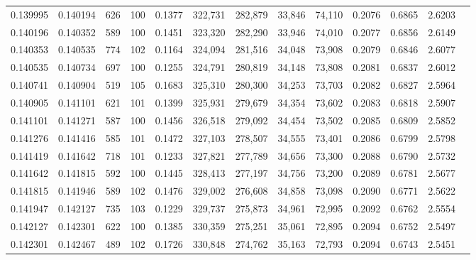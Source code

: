 \begin{tabular}{rrrrrrrrrrrrr}
0.139995 & 0.140194 &   626 & 100 &                                     0.1377 & 322,731 & 282,879 &  33,846 &  74,110 & 0.2076 & 0.6865 & 2.6203 \\
0.140196 & 0.140352 &   589 & 100 &                                     0.1451 & 323,320 & 282,290 &  33,946 &  74,010 & 0.2077 & 0.6856 & 2.6149 \\
0.140353 & 0.140535 &   774 & 102 &                                     0.1164 & 324,094 & 281,516 &  34,048 &  73,908 & 0.2079 & 0.6846 & 2.6077 \\
0.140535 & 0.140734 &   697 & 100 &                                     0.1255 & 324,791 & 280,819 &  34,148 &  73,808 & 0.2081 & 0.6837 & 2.6012 \\
0.140741 & 0.140904 &   519 & 105 &                                     0.1683 & 325,310 & 280,300 &  34,253 &  73,703 & 0.2082 & 0.6827 & 2.5964 \\
0.140905 & 0.141101 &   621 & 101 &                                     0.1399 & 325,931 & 279,679 &  34,354 &  73,602 & 0.2083 & 0.6818 & 2.5907 \\
0.141101 & 0.141271 &   587 & 100 &                                     0.1456 & 326,518 & 279,092 &  34,454 &  73,502 & 0.2085 & 0.6809 & 2.5852 \\
0.141276 & 0.141416 &   585 & 101 &                                     0.1472 & 327,103 & 278,507 &  34,555 &  73,401 & 0.2086 & 0.6799 & 2.5798 \\
0.141419 & 0.141642 &   718 & 101 &                                     0.1233 & 327,821 & 277,789 &  34,656 &  73,300 & 0.2088 & 0.6790 & 2.5732 \\
0.141642 & 0.141815 &   592 & 100 &                                     0.1445 & 328,413 & 277,197 &  34,756 &  73,200 & 0.2089 & 0.6781 & 2.5677 \\
0.141815 & 0.141946 &   589 & 102 &                                     0.1476 & 329,002 & 276,608 &  34,858 &  73,098 & 0.2090 & 0.6771 & 2.5622 \\
0.141947 & 0.142127 &   735 & 103 &                                     0.1229 & 329,737 & 275,873 &  34,961 &  72,995 & 0.2092 & 0.6762 & 2.5554 \\
0.142127 & 0.142301 &   622 & 100 &                                     0.1385 & 330,359 & 275,251 &  35,061 &  72,895 & 0.2094 & 0.6752 & 2.5497 \\
0.142301 & 0.142467 &   489 & 102 &                                     0.1726 & 330,848 & 274,762 &  35,163 &  72,793 & 0.2094 & 0.6743 & 2.5451 \\

\end{tabular}
